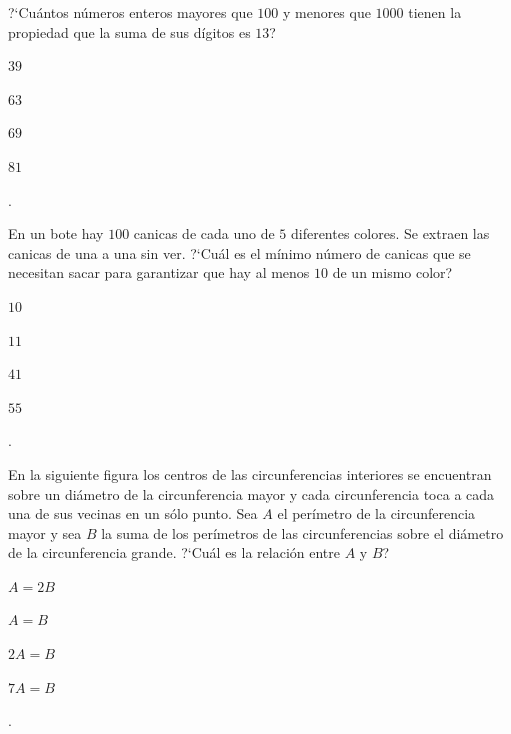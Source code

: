 \begin{Problema}{8}
  ?`Cu\'antos n\'umeros enteros mayores que $100$ y menores que
  $1000$ tienen la propiedad que la suma de sus d\'igitos es $13$?

  \begin{inparaenum}
  \item $39$ \esp
  \item $63$ \esp
  \item $69$ \esp
  \item $81$ \esp
  \item \nota.
  \end{inparaenum}
\end{Problema}

\begin{Solucion}
  
\end{Solucion}

\begin{Problema}{9}
  En un bote hay $100$ canicas de cada uno de $5$ diferentes
  colores. Se extraen las canicas de una a una sin ver. ?`Cu\'al es el
  m\'inimo n\'umero de canicas que se necesitan sacar para garantizar
  que hay al menos $10$ de un mismo color?

  \begin{inparaenum}
  \item $10$ \esp
  \item $11$ \esp
  \item $41$ \esp
  \item $55$ \esp
  \item \nota.
  \end{inparaenum}
\end{Problema}

\begin{Solucion}
  
\end{Solucion}

\begin{Problema}{10}
  En la siguiente figura los centros de las circunferencias interiores
  se encuentran sobre un di\'ametro de la circunferencia mayor y cada
  circunferencia toca a cada una de sus vecinas en un s\'olo punto.
  Sea $A$ el per\'imetro de la circunferencia mayor y sea $B$ la suma
  de los per\'imetros de las circunferencias sobre el di\'ametro de la
  circunferencia grande. ?`Cu\'al es la relaci\'on entre $A$ y $B$?

  \begin{center}
  \end{center}

  \begin{inparaenum}
  \item $A=2 B$ \espc
  \item $A=B$ \espc
  \item $2 A= B$ \espc
  \item $7 A = B$ \espc
  \item \nota.
  \end{inparaenum}
\end{Problema}

